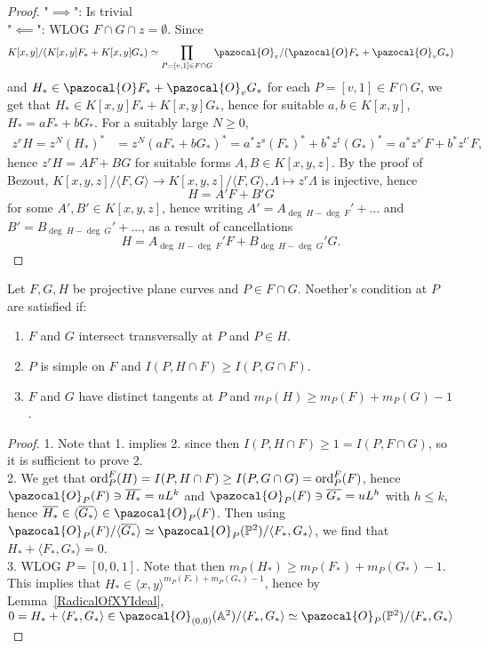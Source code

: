     \begin{proof}
        "$\implies$": Is trivial\\
        "$\impliedby$": WLOG $F\cap G\cap z=\emptyset$. Since $$K[x,y]/(K[x,y]F_\ast+K[x,y]G_\ast)\simeq \prod_{P=[v,1]\in F\cap G} \pazocal{O}_v/(\pazocal{O}F_\ast+\pazocal{O}_vG_\ast)$$
        and $H_\ast\in \pazocal{O}F_\ast+\pazocal{O}_vG_\ast$ for each $P=[v,1]\in F\cap G$, we get that $H_\ast \in K[x,y]F_\ast+K[x,y]G_\ast$, hence for suitable $a,b\in K[x,y]$, $H_\ast = aF_\ast+bG_\ast$. For a suitably large $N\geq 0$,
        \begin{align*} 
            z^rH=z^N(H_\ast)^\ast &= z^N(aF_\ast+bG_\ast)^\ast = a^\ast z^s(F_\ast)^\ast+b^\ast z^t (G_\ast)^\ast = a^\ast z^{s'}F+b^\ast z^{t'}F,
        \end{align*}
        hence $z^rH=AF+BG$ for suitable forms $A,B\in K[x,y,z]$. By the proof of Bezout, $K[x,y,z]/\langle F,G\rangle \rightarrow K[x,y,z]/\langle F,G\rangle, \Lambda\mapsto z^r\Lambda $ is injective, hence 
        $$H= A'F+B'G$$
        for some $A',B'\in K[x,y,z]$, hence writing $A' = A_{\deg \ H- \deg \ F}'+\dots$ and $B' =B_{\deg \ H- \deg \ G}'+\dots$, as a result of cancellations
        $$H= A_{\deg \ H- \deg \ F}'F+B_{\deg \ H- \deg \ G}'G.$$
    \end{proof}
    \begin{proposition}\label{SufficientConditionsForNoethersCondition}
        Let $F,G,H$ be projective plane curves and $P\in F\cap G$. Noether's condition at $P$ are satisfied if:
        \begin{enumerate}
            \item $F$ and $G$ intersect transversally at $P$ and $P\in H$. 
            \item $P$ is simple on $F$ and $I(P,H\cap F)\geq I(P,G\cap F)$.
            \item $F$ and $G$ have distinct tangents at $P$ and $m_P(H)\geq m_P(F)+m_P(G)-1$.
        \end{enumerate}
    \end{proposition}
    \begin{proof}
        1. Note that 1. implies 2. since then $I(P,H\cap F)\geq 1 = I(P,F\cap G)$, so it is sufficient to prove 2.\\
        2. We get that $\mathrm{ord}^F_P(H)=I(P,H\cap F)\geq I(P,G\cap G)=\mathrm{ord}^F_P(F)$, hence $\pazocal{O}_P(F)\ni \overline{H_\ast} = uL^k$ and $\pazocal{O}_P(F)\ni \overline{G_\ast} = uL^h$ with $h\leq k$, hence $\overline{H_\ast}\in \langle \overline{G_\ast}\rangle \in \pazocal{O}_P(F)$. Then using $\pazocal{O}_P(F)/\langle \overline{G_\ast}\rangle\simeq \pazocal{O}_P(\Pp^2)/\langle F_\ast,G_\ast\rangle$, we find that $H_\ast+\langle F_\ast,G_\ast\rangle =0$.\\
        3. WLOG $P=[0,0,1]$. Note that then $m_P(H_\ast)\geq m_P(F_\ast)+m_P(G_\ast)-1$. This implies that $H_\ast \in \langle x,y\rangle^{m_P(F_\ast)+m_P(G_\ast)-1}$, hence by Lemma~\ref{RadicalOfXYIdeal}, $0=H_\ast+\langle F_\ast,G_\ast\rangle \in \pazocal{O}_{(0,0)}(\A^2)/\langle F_\ast,G_\ast\rangle \simeq \pazocal{O}_P(\Pp^2)/\langle F_\ast,G_\ast\rangle$
    \end{proof}
